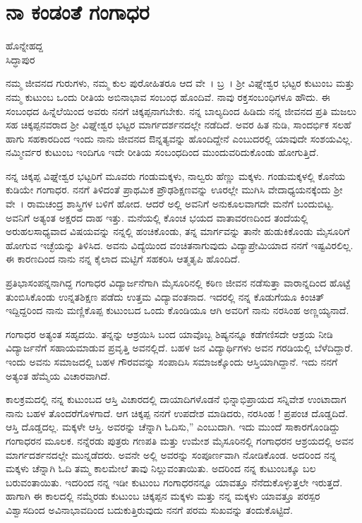 {\fontsize{14}{16}\selectfont
\chapter{ನಾ ಕಂಡಂತೆ ಗಂಗಾಧರ}

\begin{center}
\smallskip

ಹೊನ್ನೇಹದ್ದ\\ 
ಸಿದ್ಧಾಪುರ
\addrule
\end{center}

ನಮ್ಮ ಜೀವನದ ಗುರುಗಳು, ನಮ್ಮ ಕುಲ ಪುರೋಹಿತರೂ ಆದ ವೇ~। ಬ್ರ~। ಶ್ರೀ ವಿಘ್ನೇಶ್ವರ ಭಟ್ಟರ ಕುಟುಂಬ ಮತ್ತು ನಮ್ಮ ಕುಟುಂಬ ಒಂದು ರೀತಿಯ ಅಬಿನಾಭಾವ ಸಂಬಂಧ ಹೊಂದಿವೆ. ನಾವು ರಕ್ತಸಂಬಂಧಿಗಳೂ ಹೌದು. ಈ ಸಂಬಂಧದ ಹಿನ್ನೆಲೆಯಿಂದ ಅವರು ನನಗೆ ಚಿಕ್ಕಪ್ಪನಾಗಬೇಕು. ನನ್ನ ಬಾಲ್ಯದಿಂದ ಹಿಡಿದು ನನ್ನ ಜೀವನದ ಪ್ರತಿ ಮಜಲು ಸಹ ಚಿಕ್ಕಪ್ಪನವರಾದ ಶ್ರೀ ವಿಘ್ನೇಶ್ವರ ಭಟ್ಟರ ಮಾರ್ಗದರ್ಶನದಲ್ಲೇ ನಡೆದಿದೆ. ಅವರ ಹಿತ ನುಡಿ, ಸಾಂದರ್ಭಿಕ ಸಲಹೆ ಹಾಗು ಸಹಕಾರದಿಂದ ಇಂದು ನಾನು ಜೀವನದ ಔನ್ನತ್ಯವನ್ನು ಹೊಂದಿದ್ದೇನೆ ಎಂಬುದರಲ್ಲಿ ಯಾವುದೇ ಸಂಶಯವಿಲ್ಲ. ನಮ್ಮೀರ್ವರ ಕುಟುಂಬ ಇಂದಿಗೂ ಇದೇ ರೀತಿಯ ಸಂಬಂಧದಿಂದ ಮುಂದುವರಿದುಕೊಂಡು ಹೋಗುತ್ತಿದೆ.

ನನ್ನ ಚಿಕ್ಕಪ್ಪ ವಿಘ್ನೇಶ್ವರ ಭಟ್ಟರಿಗೆ ಮೂವರು ಗಂಡುಮಕ್ಕಳು, ನಾಲ್ವರು ಹೆಣ್ಣು ಮಕ್ಕಳು. ಗಂಡುಮಕ್ಕಳಲ್ಲಿ ಕೊನೆಯ ಕುಡಿಯೇ ಗಂಗಾಧರ. ನನಗೆ ತಿಳಿದಂತೆ ಪ್ರಾಥಮಿಕ ಪ್ರೌಢಶಿಕ್ಷಣವನ್ನು ಊರಲ್ಲೇ ಮುಗಿಸಿ ವೇದಾಧ್ಯಯನಕ್ಕೆಂದು ಶ್ರೀ ವೇ~। ರಾಮಚಂದ್ರ ಶಾಸ್ತ್ರಿಗಳ ಬಳಿಗೆ ಹೋದ. ಆದರೆ ಅಲ್ಲಿ ಅವನಿಗೆ ಅನುಕೂಲವಾಗದೇ ಮನೆಗೆ ಬಂದುಬಿಟ್ಟ. ಅವನಿಗೆ ಅತ್ಯಂತ ಅಕ್ಷರದ ದಾಹ ಇತ್ತು. ಮನೆಯಲ್ಲಿ ಕೊಂಚ ಭಯದ ವಾತಾವರಣದಿಂದ ತಂದೆಯಲ್ಲಿ ಅರುಹಲಸಾಧ್ಯವಾದ ವಿಷಯವನ್ನು ನನ್ನಲ್ಲಿ ಹಂಚಿಕೊಂಡು, ತನ್ನ ಮಾರ್ಗವನ್ನು ತಾನೇ ಹುಡುಕಿಕೊಂಡು ಮೈಸೂರಿಗೆ ಹೋಗುವ ಇಚ್ಛೆಯನ್ನು ತಿಳಿಸಿದ. ಅವನು ವಿದ್ಯೆಯಿಂದ ವಂಚಿತನಾಗುವುದು ವಿದ್ಯಾಪ್ರೇಮಿಯಾದ ನನಗೆ ಇಷ್ಟವಿರಲಿಲ್ಲ.  ಈ ಕಾರಣದಿಂದ ನಾನು ನನ್ನ ಕೈಲಾದ ಮಟ್ಟಿಗೆ ಸಹಕರಿಸಿ  ಆತ್ಮತೃಪಿ ಹೊಂದಿದೆ.

ಪ್ರತಿಭಾಸಂಪನ್ನನಾಗಿದ್ದ ಗಂಗಾಧರ ವಿದ್ಯಾರ್ಜನೆಗಾಗಿ ಮೈಸೂರಿನಲ್ಲಿ ಕಠಿಣ ಜೀವನ ನಡೆಸುತ್ತಾ ವಾರಾನ್ನದಿಂದ ಹೊಟ್ಟೆ ತುಂಬಿಸಿಕೊಂಡು  ಉನ್ನತಶಿಕ್ಷಣ ಪಡೆದು ಉತ್ತಮ ವಿದ್ಯಾವಂತನಾದ. ಇದರಲ್ಲಿ ನನ್ನ ಕೊಡುಗೆಯೂ ಕಿಂಚಿತ್ ಇದ್ದಿದ್ದರಿಂದ ನಾನು ಮಣ್ಣಿಕೊಪ್ಪ ಕುಟುಂಬದ ಒಂದು ಕೊಂಡಿಯೂ ಆಗಿ ಅವರಿಗೆ ನಾನು ನರಸಿಂಹ ಅಣ್ಣಯ್ಯನಾದೆ. 

ಗಂಗಾಧರ ಅತ್ಯಂತ ಸಹೃದಯಿ. ತನ್ನನ್ನು ಆಶ್ರಯಿಸಿ ಬಂದ ಯಾವೊಬ್ಬ ಶಿಷ್ಯನನ್ನೂ ಕಡೆಗಣಿಸದೇ ಆಶ್ರಯ ನೀಡಿ ವಿದ್ಯಾರ್ಜನೆಗೆ ಸಹಾಯಮಾಡುವ ಪ್ರವೃತ್ತಿ ಅವನಲ್ಲಿದೆ. ಬಹಳ ಜನ ವಿದ್ಯಾರ್ಥಿಗಳು ಅವನ ಗರಡಿಯಲ್ಲಿ ಬೆಳೆದಿದ್ದಾರೆ. ಇಂದು ಅವನು ಸಮಾಜದಲ್ಲಿ ಬಹಳ ಗೌರವವನ್ನು ಸಂಪಾದಿಸಿ ಸಮಾಜಕ್ಕೊಂದು ಆಸ್ತಿಯಾಗಿದ್ದಾನೆ. ಇದು ನನಗೆ ಅತ್ಯಂತ ಹೆಮ್ಮೆಯ ವಿಚಾರವಾಗಿದೆ.

ಕಾಲಕ್ರಮದಲ್ಲಿ ನನ್ನ ಕುಟುಂಬದ ಆಸ್ತಿ ವಿಚಾರದಲ್ಲಿ ದಾಯಾದಿಗಳೊಡನೆ ಭಿನ್ನಾಭಿಪ್ರಾಯದ ಸನ್ನಿವೇಶ ಉಂಟಾದಾಗ ನಾನು ಬಹಳ ತೊಂದರೆಗೊಳಗಾದೆ. ಆಗ ಚಿಕ್ಕಪ್ಪ ನನಗೆ ಉಪದೇಶ ಮಾಡಿದರು, ನರಸಿಂಹ ! ಪ್ರಪಂಚ ದೊಡ್ಡದಿದೆ. ಆಸ್ತಿ ದೊಡ್ಡದಲ್ಲ. ಮಕ್ಕಳೇ ಆಸ್ತಿ. ಅವರನ್ನು ಚೆನ್ನಾಗಿ ಓದಿಸು,” ಎಂಬುದಾಗಿ. ಇದು ಮುಂದೆ ಸಾಕಾರಗೊಂಡಿದ್ದು ಗಂಗಾಧರನ ಮೂಲಕ. ನನ್ನೆರಡು ಪುತ್ರರು   \enginline{-}   ಗಣಪತಿ ಮತ್ತು ಉಮೇಶ ಮೈಸೂರಿನಲ್ಲಿ ಗಂಗಾಧರನ ಆಶ್ರಯದಲ್ಲಿ ಅವನ ಮಾರ್ಗದರ್ಶನದಲ್ಲೇ ಮುನ್ನಡೆದರು. ಅವನೇ ಅಲ್ಲಿ ಅವರನ್ನು ಸಂಪೂರ್ಣವಾಗಿ ನೋಡಿಕೊಂಡ. ಅದರಿಂದ ನನ್ನ ಮಕ್ಕಳು ಚೆನ್ನಾಗಿ ಓದಿ ತಮ್ಮ ಕಾಲಮೇಲೆ ತಾವು ನಿಲ್ಲುವಂತಾಯಿತು.  ಅದರಿಂದ ನನ್ನ ಕುಟುಂಬಕ್ಕೂ  ಬಲ ಬರುವಂತಾಯಿತು. ಇದರಿಂದ ನನ್ನ ಇಡೀ ಕುಟುಂಬ ಗಂಗಾಧರನನ್ನೂ ಯಾವತ್ತೂ ನೆನೆದುಕೊಳ್ಳುತ್ತಲೇ ಇರುತ್ತದೆ. ಹಾಗಾಗಿ ಈ ಕಾಲದಲ್ಲಿ ನಮ್ಮೆರಡು ಕುಟುಂಬ   \enginline{-}   ಚಿಕ್ಕಪ್ಪನ ಮಕ್ಕಳು ಮತ್ತು ನನ್ನ ಮಕ್ಕಳು ಯಾವತ್ತೂ ಪರಸ್ಪರ ವಿಶ್ವಾಸದಿಂದ   \enginline{-}   ಅವಿನಾಭಾವದಿಂದ ಬದುಕುತ್ತಿರುವುದು ನನಗೆ ಪರಮ ಸುಖವನ್ನು ತಂದುಕೊಟ್ಟಿದೆ. 

}
